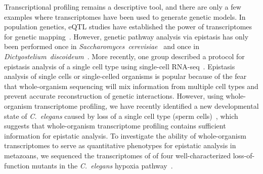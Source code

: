 \documentclass[10pt, onecolumn]{article}
\newcommand{\cel}{\emph{C.~elegans}}
\begin{document}
Transcriptional profiling remains a descriptive tool, and there are only a few
examples where transcriptomes have been used to generate genetic models. In
population genetics, eQTL studies have established the power of transcriptomes
for genetic mapping~\cite{Brem2002,Schadt2003,Li2006,King2014}. However, genetic
pathway analysis via epistasis has only been performed once in
\emph{Saccharomyces~cerevisiae}~\cite{Hughes2000} and once in
\emph{Dictyostelium~discoideum}~\cite{VanDriessche2005}. More
recently, one group described a protocol for epistasis analysis of a single cell
type using single-cell RNA-seq~\cite{Dixit2016}. Epistasis analysis of single
cells or single-celled organisms is popular because of the fear that
whole-organism sequencing will mix information from multiple cell types and
prevent accurate reconstruction of genetic interactions. However, using
whole-organism transcriptome profiling, we have recently identified a new
developmental state of \cel{} caused by loss of a single cell type (sperm
cells)~\cite{Angeles-Albores2016a}, which suggests that whole-organism
transcriptome profiling contains sufficient information for epistatic analysis.
To investigate the ability of whole-organism transcriptomes to serve as quantitative
phenotypes for epistatic analysis in metazoans, we sequenced the transcriptomes
of of four well-characterized loss-of-function mutants in the \cel{} hypoxia
pathway~\cite{Epstein2001,Shen2006,Shao2009,Jiang2001}.
\end{document}
